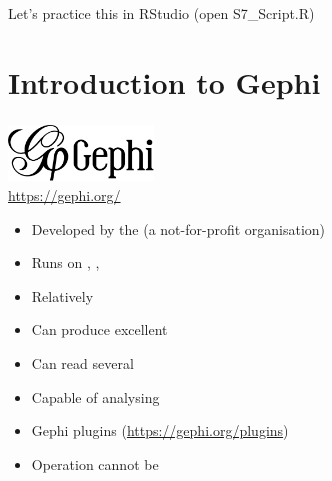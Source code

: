 \documentclass[8pt]{beamer}
\begin{document}

\begin{frame}
\frametitle{\insertsection}

Let's practice this in RStudio (open S7\_Script.R)

\end{frame}

 


\section{Introduction to Gephi}

\bgroup
{}
\begin{frame}[plain]{}
\begin{center}
\color{white}{\Huge\insertsection}
\end{center}
\end{frame}
\egroup


\begin{frame}
\frametitle{\insertsection}

\begin{center}
\includegraphics[height=1.5cm]{gephi_logo}\\
\url{https://gephi.org/}
\end{center}

\begin{itemize}
\item Developed by the {\color{blue}{Gephi Consortium}} (a not-for-profit organisation)
\item Runs on {\color{blue}{Windows}}, {\color{blue}{Linux}}, {\color{blue}{Mac OSX}}
\item Relatively {\color{blue}{user-friendly}}
\item Can produce excellent {\color{blue}{network visualizations}}
\item Can read several {\color{blue}{file formats}}
\item Capable of analysing {\color{blue}{relatively large networks}}
\item Gephi plugins (\url{https://gephi.org/plugins})
\item Operation cannot be {\color{red}{automated}}
\end{itemize}

\end{frame}
\end{document}
